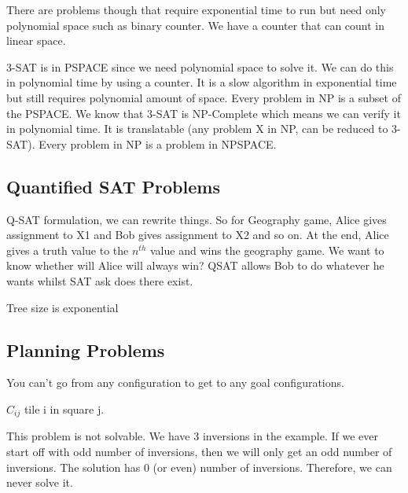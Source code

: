 \documentclass[11pt, oneside]{article}
\theoremstyle{definition}
\begin{document}
There are problems though that require exponential time to run but need only polynomial space such as binary counter. We have a counter that can count in linear space.

3-SAT is in PSPACE since we need polynomial space to solve it. We can do this in polynomial time by using a counter. It is a slow algorithm in exponential time but still requires polynomial amount of space. Every problem in NP is a subset of the PSPACE. We know that 3-SAT is NP-Complete which means we can verify it in polynomial time. It is translatable (any problem X in NP, can be reduced to 3-SAT). Every problem in NP is a problem in NPSPACE.

\subsection{Quantified SAT Problems}
Q-SAT formulation, we can rewrite things. So for Geography game, Alice gives assignment to X1 and Bob gives assignment to X2 and so on. At the end, Alice gives a truth value to the $n^{th}$ value and wins the geography game. We want to know whether will Alice will always win?
QSAT allows Bob to do whatever he wants whilst SAT ask does there exist.

Tree size is exponential

\subsection{Planning Problems}
You can't go from any configuration to get to any goal configurations.

$C_{ij}$ tile i in square j.

This problem is not solvable. We have 3 inversions in the example. If we ever start off with odd number of inversions, then we will only get an odd number of inversions. The solution has 0 (or even) number of inversions. Therefore, we can never solve it.
\end{document}
